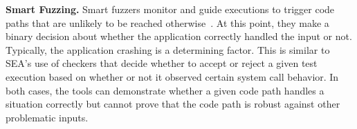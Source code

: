 {\bf Smart Fuzzing.}
Smart fuzzers monitor and guide executions to
trigger code paths that are unlikely to be reached
otherwise~\cite{smartfuzzing, taintbasefuzzing}.
At this point, they make a binary decision about
whether the application correctly handled the input or not.
Typically, the application crashing is a determining factor.
This is similar to SEA's use of checkers that decide whether
to accept or reject a given test
execution based on whether or not it observed certain system call behavior.
In both cases, the tools can demonstrate whether a given code path handles a
situation correctly but cannot prove that the code path is robust against
other problematic inputs.

%



